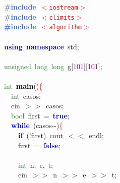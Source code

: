 
{\ttfamily \raggedright {
\noindent
\mbox{}\textbf{\textcolor{RoyalBlue}{\#include}}\ \texttt{\textcolor{Red}{$<$iostream$>$}} \\
\mbox{}\textbf{\textcolor{RoyalBlue}{\#include}}\ \texttt{\textcolor{Red}{$<$climits$>$}} \\
\mbox{}\textbf{\textcolor{RoyalBlue}{\#include}}\ \texttt{\textcolor{Red}{$<$algorithm$>$}} \\
\mbox{} \\
\mbox{}\textbf{\textcolor{Blue}{using}}\ \textbf{\textcolor{Blue}{namespace}}\ std\textcolor{BrickRed}{;} \\
\mbox{} \\
\mbox{}\textcolor{ForestGreen}{unsigned}\ \textcolor{ForestGreen}{long}\ \textcolor{ForestGreen}{long}\ g\textcolor{BrickRed}{[}\textcolor{Purple}{101}\textcolor{BrickRed}{][}\textcolor{Purple}{101}\textcolor{BrickRed}{];} \\
\mbox{} \\
\mbox{}\textcolor{ForestGreen}{int}\ \textbf{\textcolor{Black}{main}}\textcolor{BrickRed}{()}\textcolor{Red}{\{} \\
\mbox{}\ \ \textcolor{ForestGreen}{int}\ casos\textcolor{BrickRed}{;} \\
\mbox{}\ \ cin\ \textcolor{BrickRed}{$>$$>$}\ casos\textcolor{BrickRed}{;} \\
\mbox{}\ \ \textcolor{ForestGreen}{bool}\ first\ \textcolor{BrickRed}{=}\ \textbf{\textcolor{Blue}{true}}\textcolor{BrickRed}{;} \\
\mbox{}\ \ \textbf{\textcolor{Blue}{while}}\ \textcolor{BrickRed}{(}casos\textcolor{BrickRed}{-\/-)}\textcolor{Red}{\{} \\
\mbox{}\ \ \ \ \textbf{\textcolor{Blue}{if}}\ \textcolor{BrickRed}{(!}first\textcolor{BrickRed}{)}\ cout\ \textcolor{BrickRed}{$<$$<$}\ endl\textcolor{BrickRed}{;} \\
\mbox{}\ \ \ \ first\ \textcolor{BrickRed}{=}\ \textbf{\textcolor{Blue}{false}}\textcolor{BrickRed}{;} \\
\mbox{} \\
\mbox{}\ \ \ \ \textcolor{ForestGreen}{int}\ n\textcolor{BrickRed}{,}\ e\textcolor{BrickRed}{,}\ t\textcolor{BrickRed}{;} \\
\mbox{}\ \ \ \ cin\ \textcolor{BrickRed}{$>$$>$}\ n\ \textcolor{BrickRed}{$>$$>$}\ e\ \textcolor{BrickRed}{$>$$>$}\ t\textcolor{BrickRed}{;} \\
}}
